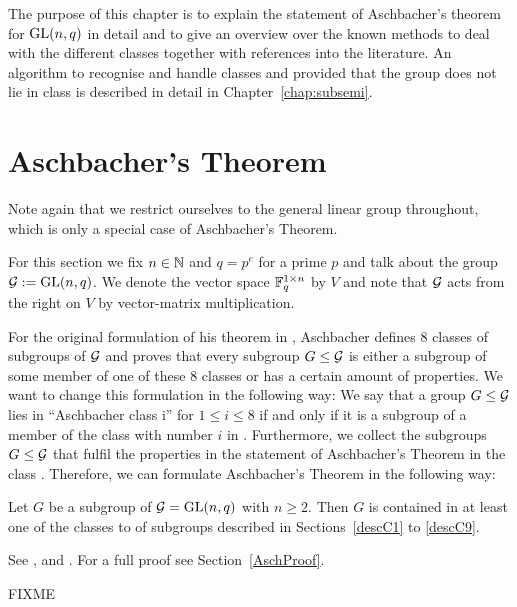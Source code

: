 The purpose of this chapter is to explain the statement of Aschbacher's 
theorem for $\GL(n,q)$ in detail and to give an overview over the known
methods to deal with the different classes together with references into
the literature. An algorithm to recognise and handle classes  and 
provided that the group does not lie in class  is described in detail
in Chapter~\ref{chap:subsemi}.

\section{Aschbacher's Theorem}
\label{sect:aschbacher}

Note again that we restrict ourselves to the general linear group
throughout, which is only a special case of Aschbacher's Theorem.

\begin{Not}
For this section we fix $n \in \mathbb{N}$ and $q=p^e$ for a prime $p$ and
talk about the group $\GG := \GL(n,q)$. We denote the vector space $\mathbb{F}_q^{1
\times n}$ by $V$ and note that $\mathcal{G}$ acts from the right on $V$ by
vector-matrix multiplication.
\end{Not}

For the original formulation of his theorem in \cite{aschbacher}, Aschbacher 
defines $8$ classes
of subgroups of $\mathcal{G}$ and proves that every subgroup $G \le \mathcal{G}$ is either
a subgroup of some member of one of these $8$ classes or has a certain
amount of properties. We want to change this formulation in the following
way: We say that a group $G \le \mathcal{G}$ lies in ``Aschbacher class \CC i''
for $1 \le i \le 8$ if and only if it is a subgroup of a member of
the class with number $i$ in \cite{aschbacher}. Furthermore, we collect
the subgroups $G \le \mathcal{G}$ that fulfil the properties in the statement of 
Aschbacher's Theorem in the class . Therefore, we can formulate
Aschbacher's Theorem in the following way:

\begin{Theo}
\label{Asch}
Let $G$ be a subgroup of\/ $\GG = \GL(n,q)$ with $n \ge 2$.
Then $G$ is contained in at least one of the
classes  to  of subgroups described in Sections~\ref{descC1}
to \ref{descC9}.
\end{Theo}
\proofbeg See \cite{aschbacher}, \cite{kleilieb} and
\cite[Theorem~1]{smashprim}. For a full proof see Section~\ref{AschProof}.
\proofend

\begin{Rem}
FIXME
\end{Rem}

